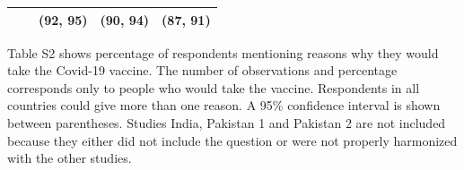 \documentclass[
  12pt,
]{article}
\begin{document}
\begin{table}
\begin{threeparttable}
\begin{tabular}[t]{>{\raggedright\arraybackslash}p{8em}>{\centering\arraybackslash}p{4em}>{\centering\arraybackslash}p{4em}>{\centering\arraybackslash}p{4em}c}
 &  & (92, 95) & (90, 94) & (87, 91)\\
\bottomrule
\end{tabular}
\begin{tablenotes}
\item Table S2 shows percentage of respondents mentioning reasons why they would take the Covid-19 vaccine. The number of observations and percentage corresponds only to people who would take the vaccine. Respondents in all countries could give more than one reason. A 95\% confidence interval is shown between parentheses. Studies India, Pakistan 1 and Pakistan 2 are not included because they either did not include the question or were not properly harmonized with the other studies.
\end{tablenotes}
\end{threeparttable}
\end{table}

\newpage
\end{document}

